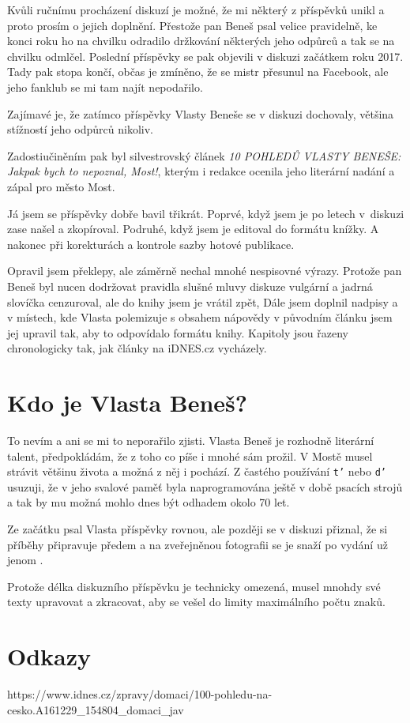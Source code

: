 Kvůli ručnímu procházení diskuzí je možné, že mi některý z příspěvků unikl a
proto prosím o jejich doplnění. Přestože pan Beneš psal velice pravidelně, ke
konci roku ho na chvilku odradilo držkování některých jeho odpůrců a tak se na
chvilku odmlčel. Poslední příspěvky se pak objevili v diskuzi začátkem roku
2017. Tady pak stopa končí, občas je zmíněno, že se mistr přesunul na Facebook,
ale jeho fanklub se mi tam najít nepodařilo.

Zajímavé je, že zatímco příspěvky Vlasty Beneše se v diskuzi dochovaly, většina
stížností jeho odpůrců nikoliv.

Zadostiučiněním pak byl silvestrovský článek {\em 10 POHLEDŮ VLASTY BENEŠE:
Jakpak bych to nepoznal, Most!}, kterým i redakce ocenila jeho literární nadání
a zápal pro město Most.

Já jsem se příspěvky dobře bavil třikrát. Poprvé, když jsem je po letech
v~diskuzi zase našel a zkopíroval. Podruhé, když jsem je editoval do formátu
knížky. A nakonec při korekturách a kontrole sazby hotové publikace.

Opravil jsem překlepy, ale záměrně nechal mnohé nespisovné výrazy. Protože pan
Beneš byl nucen dodržovat pravidla slušné mluvy diskuze vulgární a jadrná
slovíčka cenzuroval, ale do knihy jsem je vrátil zpět,  Dále jsem doplnil
nadpisy a v místech, kde Vlasta polemizuje s obsahem nápovědy v původním článku
jsem jej upravil tak, aby to odpovídalo formátu knihy. Kapitoly jsou řazeny
chronologicky tak, jak články na iDNES.cz vycházely.

\section{Kdo je Vlasta Beneš?}

To nevím a ani se mi to neporařilo zjisti. Vlasta Beneš je rozhodně literární
talent, předpokládám, že z toho co píše i mnohé sám prožil. V Mostě musel
strávit většinu života a možná z něj i pochází. Z častého používání {\tt t'}
nebo {\tt d'} usuzuji, že v jeho svalové paměť byla naprogramována ještě v době
psacích strojů a tak by mu možná mohlo dnes být odhadem okolo 70 let.

Ze začátku psal Vlasta příspěvky rovnou, ale později se v diskuzi přiznal, že
si příběhy připravuje předem a na zveřejněnou fotografii se je snaží po vydání
už jenom .

Protože délka diskuzního příspěvku je technicky omezená, musel mnohdy své texty
upravovat a zkracovat, aby se vešel do limity maximálního počtu znaků.

\section{Odkazy}

https://www.idnes.cz/zpravy/domaci/100-pohledu-na-cesko.A161229_154804_domaci_jav

